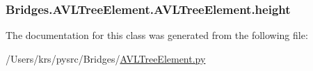 \subsubsection[{height}]{\setlength{\rightskip}{0pt plus 5cm}Bridges.\+A\+V\+L\+Tree\+Element.\+A\+V\+L\+Tree\+Element.\+height}\label{class_bridges_1_1_a_v_l_tree_element_1_1_a_v_l_tree_element_af8856cd0f69c2299f293fe5c4891651f}


The documentation for this class was generated from the following file\+:\begin{DoxyCompactItemize}
\item 
/\+Users/krs/pysrc/\+Bridges/\hyperlink{_a_v_l_tree_element_8py}{A\+V\+L\+Tree\+Element.\+py}\end{DoxyCompactItemize}
